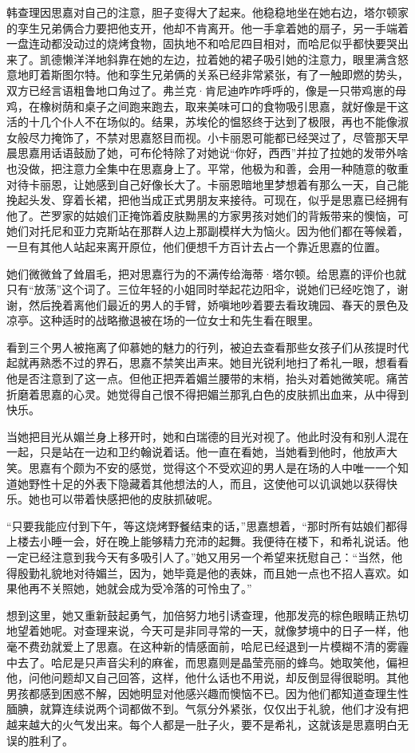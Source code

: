 \par 韩查理因思嘉对自己的注意，胆子变得大了起来。他稳稳地坐在她右边，塔尔顿家的孪生兄弟俩合力要把他支开，他却不肯离开。他一手拿着她的扇子，另一手端着一盘连动都没动过的烧烤食物，固执地不和哈尼四目相对，而哈尼似乎都快要哭出来了。凯德懒洋洋地斜靠在她的左边，拉着她的裙子吸引她的注意力，眼里满含怒意地盯着斯图尔特。他和孪生兄弟俩的关系已经非常紧张，有了一触即燃的势头，双方已经言语粗鲁地口角过了。弗兰克·肯尼迪咋咋呼呼的，像是一只带鸡崽的母鸡，在橡树荫和桌子之间跑来跑去，取来美味可口的食物吸引思嘉，就好像是干这活的十几个仆人不在场似的。结果，苏埃伦的愠怒终于达到了极限，再也不能像淑女般尽力掩饰了，不禁对思嘉怒目而视。小卡丽恩可能都已经哭过了，尽管那天早晨思嘉用话语鼓励了她，可布伦特除了对她说“你好，西西”并拉了拉她的发带外啥也没做，把注意力全集中在思嘉身上了。平常，他极为和善，会用一种随意的敬重对待卡丽恩，让她感到自己好像长大了。卡丽恩暗地里梦想着有那么一天，自己能挽起头发、穿着长裙，把他当成正式男朋友来接待。可现在，似乎是思嘉已经拥有他了。芒罗家的姑娘们正掩饰着皮肤黝黑的方家男孩对她们的背叛带来的懊恼，可她们对托尼和亚力克斯站在那群人边上那副模样大为恼火。因为他们都在等候着，一旦有其他人站起来离开原位，他们便想千方百计去占一个靠近思嘉的位置。
\par 她们微微耸了耸眉毛，把对思嘉行为的不满传给海蒂·塔尔顿。给思嘉的评价也就只有“放荡”这个词了。三位年轻的小姐同时举起花边阳伞，说她们已经吃饱了，谢谢，然后挽着离他们最近的男人的手臂，娇嗔地吵着要去看玫瑰园、春天的景色及凉亭。这种适时的战略撤退被在场的一位女士和先生看在眼里。
\par 看到三个男人被拖离了仰慕她的魅力的行列，被迫去查看那些女孩子们从孩提时代起就再熟悉不过的界石，思嘉不禁笑出声来。她目光锐利地扫了希礼一眼，想看看他是否注意到了这一点。但他正把弄着媚兰腰带的末梢，抬头对着她微笑呢。痛苦折磨着思嘉的心灵。她觉得自己恨不得把媚兰那乳白色的皮肤抓出血来，从中得到快乐。
\par 当她把目光从媚兰身上移开时，她和白瑞德的目光对视了。他此时没有和别人混在一起，只是站在一边和卫约翰说着话。他一直在看她，当她看到他时，他放声大笑。思嘉有个颇为不安的感觉，觉得这个不受欢迎的男人是在场的人中唯一一个知道她野性十足的外表下隐藏着其他想法的人，而且，这使他可以讥讽她以获得快乐。她也可以带着快感把他的皮肤抓破呢。
\par “只要我能应付到下午，等这烧烤野餐结束的话，”思嘉想着，“那时所有姑娘们都得上楼去小睡一会，好在晚上能够精力充沛的起舞。我便待在楼下，和希礼说话。他一定已经注意到我今天有多吸引人了。”她又用另一个希望来抚慰自己：“当然，他得殷勤礼貌地对待媚兰，因为，她毕竟是他的表妹，而且她一点也不招人喜欢。如果他再不关照她，她就会成为受冷落的可怜虫了。”
\par 想到这里，她又重新鼓起勇气，加倍努力地引诱查理，他那发亮的棕色眼睛正热切地望着她呢。对查理来说，今天可是非同寻常的一天，就像梦境中的日子一样，他毫不费劲就爱上了思嘉。在这种新的情感面前，哈尼已经退到一片模糊不清的雾霾中去了。哈尼是只声音尖利的麻雀，而思嘉则是晶莹亮丽的蜂鸟。她取笑他，偏袒他，问他问题却又自己回答，这样，他什么话也不用说，却反倒显得很聪明。其他男孩都感到困惑不解，因她明显对他感兴趣而懊恼不已。因为他们都知道查理生性腼腆，就算连续说两个词都做不到。气氛分外紧张，仅仅出于礼貌，他们才没有把越来越大的火气发出来。每个人都是一肚子火，要不是希礼，这就该是思嘉明白无误的胜利了。
